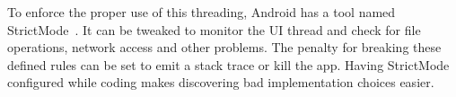  To enforce the proper use of this threading, Android has a tool named StrictMode~\cite{androidStrictMode}. It can be tweaked to monitor the UI thread and check for file operations, network access and other problems. The penalty for breaking these defined rules can be set to emit a stack trace or kill the app. Having StrictMode configured while coding makes discovering bad implementation choices easier. 

